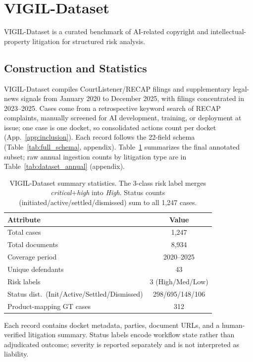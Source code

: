 \section{VIGIL-Dataset}
\label{sec:dataset}
VIGIL-Dataset is a curated benchmark of AI-related copyright and intellectual-property litigation for structured risk analysis.

\subsection{Construction and Statistics}
VIGIL-Dataset compiles CourtListener/RECAP filings and supplementary legal-news signals from January 2020 to December 2025, with filings concentrated in 2023--2025. Cases come from a retrospective keyword search of RECAP complaints, manually screened for AI development, training, or deployment at issue; one case is one docket, so consolidated actions count per docket (App.~\ref{app:inclusion}). Each record follows the 22-field \schemafile{} schema (Table~\ref{tab:full_schema}, appendix). Table~\ref{tab:dataset_stats} summarizes the final annotated subset; raw annual ingestion counts by litigation type are in Table~\ref{tab:dataset_annual} (appendix).

\begin{table}[t]
\centering
\caption{VIGIL-Dataset summary statistics. The 3-class risk label merges \emph{critical}+\emph{high} into \emph{High}. Status counts (initiated/active/settled/dismissed) sum to all 1,247 cases.}
\label{tab:dataset_stats}
\footnotesize
\setlength{\tabcolsep}{6pt}
\begin{tabular}{p{4.2cm} c}
\toprule
\textbf{Attribute} & \textbf{Value} \\
\midrule
Total cases & 1,247 \\
Total documents & 8,934 \\
Coverage period & 2020--2025 \\
Unique defendants & 43 \\
Risk labels & 3 (High/Med/Low) \\
Status dist.\ (Init/Active/Settled/Dismissed) & 298/695/148/106 \\
Product-mapping GT cases & 312 \\
\bottomrule
\end{tabular}
\end{table}

Each record contains docket metadata, parties, document URLs, and a human-verified litigation summary. Status labels encode workflow state rather than adjudicated outcome; severity is reported separately and is not interpreted as liability.


